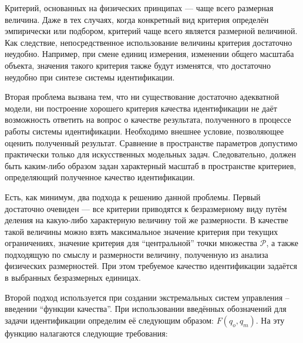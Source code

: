 Критерий, основанных на физических принципах --- чаще всего размерная
величина. Даже в тех случаях, когда конкретный вид критерия определён эмпирически
или подбором, критерий чаще всего является размерной величиной.
Как следствие, непосредственное использование величины критерия
достаточно неудобно. Например, при смене единиц измерения,
изменении общего масштаба объекта, значения такого критерия также будут
изменятся, что достаточно неудобно при синтезе системы идентификации.

Вторая проблема вызвана тем, что ни существование достаточно
адекватной модели, ни построение хорошего критерия качества идентификации
не даёт возможность ответить на вопрос о качестве результата,
полученного в процессе работы системы идентификации.
Необходимо внешнее условие, позволяющее оценить полученный результат.
Сравнение в пространстве параметров допустимо практически только для
искусственных модельных задач. Следовательно,
должен быть каким-либо образом задан характерный масштаб
в пространстве критериев, определяющий полученное качество
идентификации.

Есть, как минимум, два подхода к решению данной проблемы.
Первый достаточно очевиден --- все критерии приводятся к безразмерному виду путём деления
на какую-либо характерную величину той же размерности. В качестве такой величины
можно взять максимальное значение критерия при текущих ограничениях,
значение критерия для ``центральной'' точки множества $\mathcal{P}$,
а также подходящую по смыслу и размерности величину, полученную
из анализа физических размерностей.
При этом требуемое качество идентификации задаётся в
выбранных безразмерных единицах.

Второй подход используется при создании экстремальных систем управления
-- введении ``функции качества''.
При использовании введённых обозначений для задачи идентификации
определим её следующим образом:
\label{atu:d:F}$F(q_o, q_m)$.
На эту функцию налагаются следующие требования:


